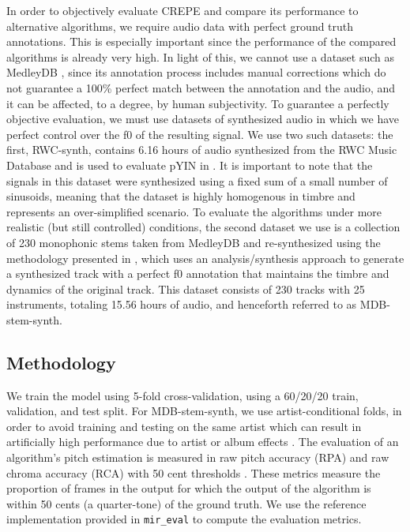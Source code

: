 In order to objectively evaluate CREPE and compare its performance to alternative algorithms, we require audio data with perfect ground truth annotations.
This is especially important since the performance of the compared algorithms is already very high.
In light of this, we cannot use a dataset such as MedleyDB \cite{bittner2014medleydb}, since its annotation process includes manual corrections which do not guarantee a 100\% perfect match between the annotation and the audio, and it can be affected, to a degree, by human subjectivity.
To guarantee a perfectly objective evaluation, we must use datasets of synthesized audio in which we have perfect control over the f0 of the resulting signal.
We use two such datasets: the first, RWC-synth, contains 6.16 hours of audio synthesized from the RWC Music Database \cite{goto2002rwc} and is used to evaluate pYIN in \cite{mauch2014pyin}.
It is important to note that the signals in this dataset were synthesized using a fixed sum of a small number of sinusoids, meaning that the dataset is highly homogenous in timbre and represents an over-simplified scenario.
To evaluate the algorithms under more realistic (but still controlled) conditions, the second dataset we use is a collection of 230 monophonic stems taken from MedleyDB and re-synthesized using the methodology presented in \cite{salamon2017analysis}, which uses an analysis/synthesis approach to generate a synthesized track with a perfect f0 annotation that maintains the timbre and dynamics of the original track.
This dataset consists of 230 tracks with 25 instruments, totaling 15.56 hours of audio, and henceforth referred to as MDB-stem-synth.


\subsection{Methodology}

We train the model using 5-fold cross-validation, using a 60/20/20 train, validation, and test split.
For MDB-stem-synth, we use artist-conditional folds, in order to avoid training and testing on the same artist which can result in artificially high performance due to artist or album effects \cite{sturm2013classification}.
The evaluation of an algorithm's pitch estimation is measured in raw pitch accuracy (RPA) and raw chroma accuracy (RCA) with 50 cent thresholds \cite{salamon2014melody}.
These metrics measure the proportion of frames in the output for which the output of the algorithm is within 50 cents (a quarter-tone) of the ground truth.
We use the reference implementation provided in \texttt{mir\_eval} \cite{raffel2014mir_eval} to compute the evaluation metrics.


